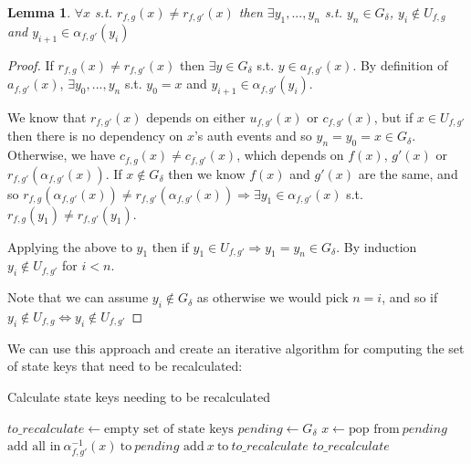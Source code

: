 \documentclass{article}
\newtheorem{lemma}[theorem]{Lemma}
\begin{document}
\begin{lemma}
	$\forall x$ s.t. $r_{f,g}(x) \neq r_{f,g'}(x)$ then $\exists y_1, ..., y_n$ s.t. $y_n \in G_\delta$, $y_i \notin U_{f,g}$ and $y_{i+1} \in \alpha_{f,g'}(y_i)$
\end{lemma}

\begin{proof}
	If $r_{f,g}(x) \neq r_{f,g'}(x)$ then $\exists y \in G_\delta$ s.t. $y \in a_{f,g'}(x)$. By definition of $a_{f,g'}(x)$, $\exists y_0, ..., y_n$ s.t. $y_0 = x$ and $y_{i+1} \in \alpha_{f,g'}(y_i)$. 
	
	We know that $r_{f,g'}(x)$ depends on either $u_{f,g'}(x)$ or $c_{f,g'}(x)$, but if $x \in U_{f,g'}$ then there is no dependency on $x$'s auth events and so $y_n = y_0 = x \in G_\delta$. Otherwise, we have $c_{f,g}(x) \neq c_{f,g'}(x)$, which depends on $f(x)$, $g'(x)$ or $r_{f,g'}(\alpha_{f,g'}(x))$. If $x \notin G_\delta$ then we know $f(x)$ and $g'(x)$ are the same, and so $r_{f,g}(\alpha_{f,g'}(x)) \neq r_{f,g'}(\alpha_{f,g'}(x)) \Rightarrow \exists y_1 \in \alpha_{f,g'}(x)$ s.t. $r_{f,g}(y_1) \neq r_{f,g'}(y_1)$.
	
	 Applying the above to $y_1$ then if $y_1 \in U_{f,g'} \Rightarrow y_1 = y_n \in G_\delta$. By induction $y_i \notin U_{f,g'}$ for $i < n$.
	 
	 Note that we can assume $y_i \notin G_\delta$ as otherwise we would pick $n = i$,  and so if $y_i \notin U_{f,g} \Leftrightarrow y_i \notin U_{f,g'}$
\end{proof}

We can use this approach and create an iterative algorithm for computing the set of state keys that need to be recalculated:

\begin{algorithm}
\caption{Calculate state keys needing to be recalculated}
\begin{algorithmic}
	\STATE $to\_recalculate \leftarrow \text{empty set of state keys}$
	\STATE $pending \leftarrow G_\delta$
		\STATE $x \leftarrow \text{pop from}\ pending$
			\STATE $\text{add all in}\ \alpha_{f,g'}^{-1}(x)\ \text{to}\ pending$
			\STATE $\text{add}\ x\ \text{to}\ to\_recalculate$
		\ENDIF
	\ENDWHILE
	\RETURN $to\_recalculate$
\end{algorithmic}
\end{algorithm}
\end{document}
